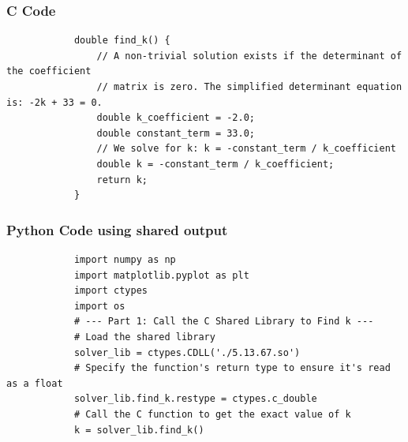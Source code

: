 \documentclass{beamer}
\begin{document}
	
	\begin{frame}[fragile]
		\frametitle{C Code}
		
		\begin{lstlisting}
			double find_k() {
				// A non-trivial solution exists if the determinant of the coefficient
				// matrix is zero. The simplified determinant equation is: -2k + 33 = 0.
				double k_coefficient = -2.0;
				double constant_term = 33.0;
				// We solve for k: k = -constant_term / k_coefficient
				double k = -constant_term / k_coefficient;
				return k;
			}
		\end{lstlisting}
	\end{frame}
	\begin{frame}[fragile]
		\frametitle{Python Code using shared output}
		
		\begin{lstlisting}
			import numpy as np
			import matplotlib.pyplot as plt
			import ctypes
			import os
			# --- Part 1: Call the C Shared Library to Find k ---
			# Load the shared library
			solver_lib = ctypes.CDLL('./5.13.67.so')
			# Specify the function's return type to ensure it's read as a float
			solver_lib.find_k.restype = ctypes.c_double
			# Call the C function to get the exact value of k
			k = solver_lib.find_k()        
		\end{lstlisting}
	\end{frame}
	
\end{document}
